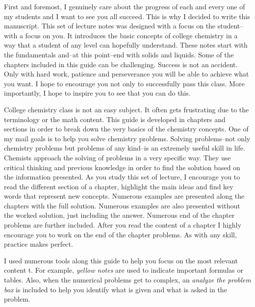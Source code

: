 \documentclass[main.tex]{subfiles}
\begin{document}
\pagestyle{style1}

\begin{fullwidth}
\begin{multicols*}{2}
First and foremost, I genuinely care about the progress of each and every one of my students and I want to see you all succeed. This is why I decided to write this manuscript. This set of lecture notes was designed with a focus on the student--with a focus on you. It introduces the basic concepts of college chemistry in a way that a student of any level can hopefully understand. These notes start with the fundamentals and--at this point--end with solids and liquids. Some of the chapters included in this guide can be challenging. Success is not an accident. Only with hard work, patience and perseverance you will be able to achieve what you want. I hope to encourage you not only to successfully pass this class. More importantly, I hope to inspire you to see that you can do this. 

College chemistry class is not an easy subject. It often gets frustrating due to the terminology or the math content. This guide is developed in chapters and sections in order to break down the very basics of the chemistry concepts. One of my mail goals is to help you solve chemistry problems. Solving problems--not only chemistry problems but problems of any kind--is an extremely useful skill in life. Chemists approach the solving of problems in a very specific way. They use critical thinking and previous knowledge in order to find the solution based on the information presented. As you study this set of lecture, I encourage you to read the different section of a chapter, highlight the main ideas and find key words that represent new concepts. Numerous examples are presented along the chapters with the full solution. Numerous examples are also presented without the worked solution, just including the answer. Numerous end of the chapter problems are further included. After you read the content of a chapter I highly encourage you to work on the end of the chapter problems. As with any skill, practice makes perfect.

I used numerous tools along this guide to help you focus on the most relevant content t. For example, \emph{yellow notes} are used to indicate important formulas or tables. Also, when the numerical problems get to complex, an \emph{analyze the problem box} is included to help you identify what is given and what is asked in the problem.


\end{multicols*}
\end{fullwidth}
\end{document}
